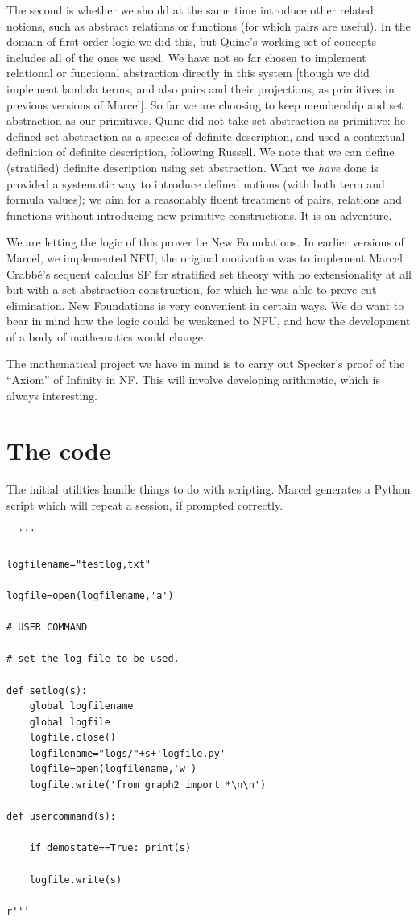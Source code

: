 \documentclass{article}
\begin{document}
 The second is whether we should at the same time introduce other related notions, such as abstract relations or functions
 (for which pairs are useful).  In the domain of first order logic we did this, but Quine's working set of concepts
 includes all of the ones we used.  We have not so far chosen to implement relational or functional abstraction directly in this system [though we did implement lambda terms, and also pairs and their projections, as primitives in previous versions of Marcel].  So far we are choosing to keep membership and set abstraction as our primitives.  Quine did not take set abstraction as primitive:  he defined set abstraction as a species of definite description, and used a contextual definition of definite description, following Russell.  We note that we can define (stratified) definite description using set abstraction.
 What we {\em have\/} done is provided a systematic way to introduce defined notions (with both term and formula values);  we aim for a reasonably fluent treatment of pairs, relations and functions without introducing new primitive constructions.  It is an adventure.
 
 We are letting the logic of this prover be New Foundations.  In earlier versions of Marcel, we implemented NFU;  the original motivation was to implement Marcel Crabb\'e's sequent calculus SF for stratified set theory with no extensionality at all but with a set abstraction construction, for which he was able to prove cut elimination.  New Foundations is very convenient in certain ways.  We do want to bear in mind how the logic could be weakened to NFU, and how the development of a body of mathematics would change.
 
 The mathematical project we have in mind is to carry out Specker's proof of the ``Axiom'' of Infinity in NF.   This will involve developing arithmetic, which is always interesting.

\section{The code}

The initial utilities handle things to do with scripting.  Marcel generates a Python script which will repeat a session, if prompted correctly.

\begin{verbatim}
  '''

logfilename="testlog,txt"

logfile=open(logfilename,'a')

# USER COMMAND

# set the log file to be used.

def setlog(s):
    global logfilename
    global logfile
    logfile.close()
    logfilename="logs/"+s+'logfile.py'
    logfile=open(logfilename,'w')
    logfile.write('from graph2 import *\n\n')

def usercommand(s):

    if demostate==True: print(s)

    logfile.write(s)
    
r'''
\end{verbatim}
\end{document}
